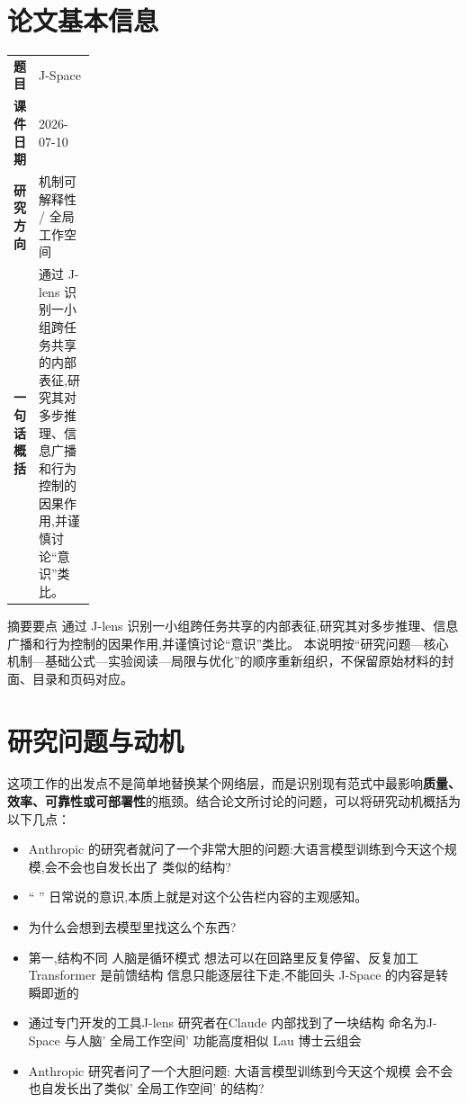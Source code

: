 \documentclass[UTF8,11pt,a4paper]{ctexart}
\newcommand{\term}[1]{\textbf{\textcolor{mainblue}{#1}}}
\begin{document}
\section{论文基本信息}
\begin{center}
\begin{tabularx}{0.94\linewidth}{>{\bfseries}p{0.18\linewidth}X}
\toprule
题目 & J-Space\\
课件日期 & 2026-07-10\\
研究方向 & 机制可解释性 / 全局工作空间\\
一句话概括 & 通过 J-lens 识别一小组跨任务共享的内部表征,研究其对多步推理、信息广播和行为控制的因果作用,并谨慎讨论“意识”类比。\\
\bottomrule
\end{tabularx}
\end{center}

\begin{infobox}{摘要要点}
通过 J-lens 识别一小组跨任务共享的内部表征,研究其对多步推理、信息广播和行为控制的因果作用,并谨慎讨论“意识”类比。 本说明按“研究问题—核心机制—基础公式—实验阅读—局限与优化”的顺序重新组织，不保留原始材料的封面、目录和页码对应。
\end{infobox}

\section{研究问题与动机}
这项工作的出发点不是简单地替换某个网络层，而是识别现有范式中最影响\term{质量、效率、可靠性或可部署性}的瓶颈。结合论文所讨论的问题，可以将研究动机概括为以下几点：
\begin{itemize}
\item Anthropic 的研究者就问了一个非常大胆的问题:大语言模型训练到今天这个规模,会不会也自发长出了 类似的结构?
\item “ ” 日常说的意识,本质上就是对这个公告栏内容的主观感知。
\item 为什么会想到去模型里找这么个东西?
\item 第一,结构不同 人脑是循环模式 想法可以在回路里反复停留、反复加工 Transformer 是前馈结构 信息只能逐层往下走,不能回头 J-Space 的内容是转瞬即逝的
\item 通过专门开发的工具J-lens 研究者在Claude 内部找到了一块结构 命名为J-Space 与人脑' 全局工作空间' 功能高度相似 Lau 博士云组会
\item Anthropic 研究者问了一个大胆问题: 大语言模型训练到今天这个规模 会不会也自发长出了类似' 全局工作空间' 的结构?
\end{itemize}
\end{document}
